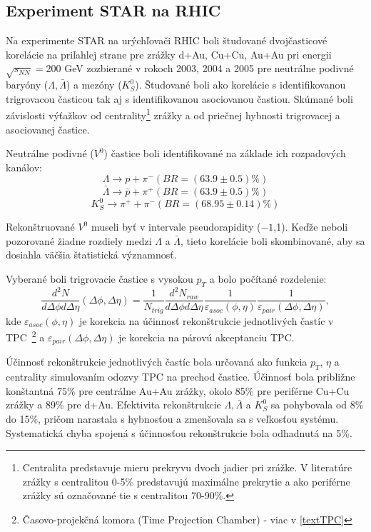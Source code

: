 \documentclass[thesismargins, thesislinespacing]{rnthesis}
\begin{document}
\subsection{Experiment STAR na RHIC}
Na experimente STAR na urýchľovači RHIC boli študované dvojčasticové korelácie na priľahlej strane pre zrážky d+Au, Cu+Cu, Au+Au pri energii $\sqrt{s_{NN}}=$200 GeV zozbierané v rokoch 2003, 2004 a 2005 pre neutrálne podivné baryóny ($\Lambda , \bar{\Lambda}$) a mezóny ($K^0_S$). Študované boli ako korelácie s identifikovanou trigrovacou časticou tak aj s identifikovanou asociovanou častiou. Skúmané boli závislosti výťažkov od centrality\footnote{Centralita predstavuje mieru prekryvu dvoch jadier pri zrážke. V literatúre zrážky s centralitou 0-5\% predstavujú maximálne prekrytie a ako periférne zrážky sú označované tie s centralitou 70-90\%.} zrážky a od priečnej hybnosti trigrovacej a asociovanej častice.

Neutrálne podivné ($V^0$) častice boli identifikované na základe ich rozpadových kanálov:
\begin{equation}
\Lambda \rightarrow p + \pi^{-}  (BR=(63.9 \pm 0.5)\%)
\end{equation}
\begin{equation}
\bar{\Lambda} \rightarrow \bar{p} + \pi^{+}  (BR=(63.9 \pm 0.5)\%)
\end{equation}
\begin{equation}
K^0_S \rightarrow \pi^{+} + \pi^{-}  (BR=(68.95 \pm 0.14)\%)
\end{equation}

Rekonštruované $V^0$ museli byť v intervale pseudorapidity ($-1$,1). Keďže neboli pozorované žiadne rozdiely medzi $\Lambda$ a $\bar{\Lambda}$, tieto korelácie boli skombinované, aby sa dosiahla väčšia štatistická významnosť.

Vyberané boli trigrovacie častice s vysokou $p_T$ a bolo počítané rozdelenie:
\begin{equation}
\frac{d^2N}{d\Delta \phi d\Delta \eta}(\Delta\phi,\Delta\eta) = \frac{1}{N_{trig}}\frac{d^2N_{raw}}{d\Delta \phi d\Delta \eta}\frac{1}{\varepsilon_{asoc}(\phi,\eta)}\frac{1}{\varepsilon_{pair}(\Delta\phi,\Delta\eta)},
\end{equation}
kde $\varepsilon_{asoc}(\phi,\eta)$ je korekcia na účinnosť rekonštrukcie jednotlivých častíc v TPC~\footnote{Časovo-projekčná komora (Time Projection Chamber) - viac v \ref{textTPC}} a $\varepsilon_{pair}(\Delta\phi,\Delta\eta)$ je korekcia na párovú akceptanciu TPC. 

Účinnosť rekonštrukcie jednotlivých častíc bola určovaná ako funkcia $p_T$, $\eta$ a centrality simulovaním odozvy TPC na prechod častice. Účinnosť bola približne konštantná 75\% pre centrálne Au+Au zrážky, okolo 85\% pre periférne Cu+Cu zrážky a 89\% pre d+Au. Efektivita rekonštrukcie $\Lambda, \bar{\Lambda}$ a $K^0_S$ sa pohybovala od 8\% do 15\%, pričom narastala s hybnosťou a zmenšovala sa s veľkosťou systému. Systematická chyba spojená s účinnosťou rekonštrukcie bola odhadnutá na 5\%.
\end{document}
